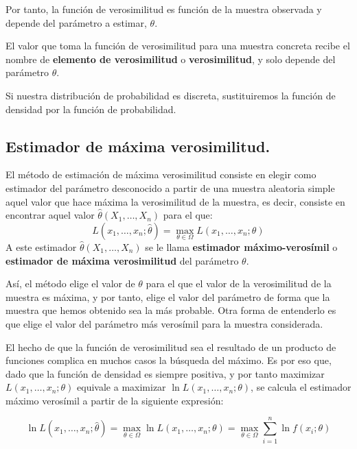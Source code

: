 Por tanto, la funci\'on de verosimilitud es funci\'on de la muestra observada y depende del par\'ametro a estimar, $\theta$.

El valor que toma la funci\'on de verosimilitud para una muestra concreta recibe el nombre de \textbf{elemento de verosimilitud} o \textbf{verosimilitud}, y solo depende del par\'ametro $\theta$.

Si nuestra distribuci\'on de probabilidad es discreta, sustituiremos la funci\'on de densidad por la funci\'on de probabilidad.

\subsection{Estimador de m\'axima verosimilitud.}

\begin{definicion}
El m\'etodo de estimaci\'on de m\'axima verosimilitud consiste en elegir como estimador del par\'ametro desconocido a partir de una muestra aleatoria simple aquel valor que hace m\'axima la verosimilitud de la muestra, es decir, consiste en encontrar aquel valor $\hat{\theta}(X_1,\ldots,X_n)$ para el que:
\begin{equation*}
L(x_1,\ldots,x_n;\hat{\theta})=\max_{\theta\in\Omega}{L(x_1,\ldots,x_n;\theta)}
\end{equation*}
A este estimador $\hat{\theta}(X_1,\ldots,X_n)$ se le llama \textbf{estimador m\'aximo-veros\'imil} o \textbf{estimador de m\'axima verosimilitud} del par\'ametro $\theta$.
\end{definicion}

As\'i, el m\'etodo elige el valor de $\theta$ para el que el valor de la verosimilitud de la muestra es m\'axima, y por tanto, elige el valor del par\'ametro de forma que la muestra que hemos obtenido sea la m\'as probable. Otra forma de entenderlo es que elige el valor del par\'ametro m\'as veros\'imil para la muestra considerada.

El hecho de que la funci\'on de verosimilitud sea el resultado de un producto de funciones complica en muchos casos la b\'usqueda del m\'aximo. Es por eso que, dado que la funci\'on de densidad es siempre positiva, y por tanto maximizar $L(x_1,\ldots,x_n;\theta)$ equivale a maximizar $\ln{L(x_1,\ldots,x_n;\theta)}$, se calcula el estimador m\'aximo veros\'imil a partir de la siguiente expresi\'on:

\begin{equation*}
\ln{L(x_1,\ldots,x_n;\hat{\theta})}=\max_{\theta\in\Omega}{\ln{L(x_1,\ldots,x_n;\theta)}}=\max_{\theta\in\Omega}{\sum_{i=1}^n\ln{f(x_i;\theta)}}
\end{equation*}

